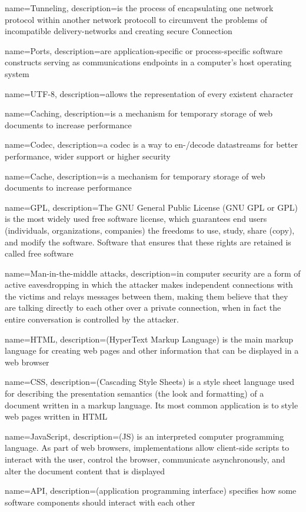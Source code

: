 {
  name=Tunneling,
  description={is the process of encapsulating one network protocol within another network protocoll to circumvent the problems of incompatible delivery-networks and creating secure Connection}
}

{
  name=Ports,
  description={are application-specific or process-specific software constructs serving as communications endpoints in a computer's host operating system}
}

{
  name=UTF-8,
  description={allows the representation of every existent character}
}

{
  name=Caching,
  description={is a mechanism for temporary storage of web documents to increase performance}
}

{
  name=Codec,
  description={a codec is a way to en-/decode datastreams for better performance, wider support or higher security}
}

{
  name=Cache,
  description={is a mechanism for temporary storage of web documents to increase performance}
}

{
  name=GPL,
  description={The GNU General Public License (GNU GPL or GPL) is the most widely used free software license, which guarantees end users (individuals, organizations, companies) the freedoms to use, study, share (copy), and modify the software. Software that ensures that these rights are retained is called free software}
}

{
  name=Man-in-the-middle attacks,
  description={in computer security are a form of active eavesdropping in which the attacker makes independent connections with the victims and relays messages between them, making them believe that they are talking directly to each other over a private connection, when in fact the entire conversation is controlled by the attacker.}
}

{
  name=HTML,
  description={(HyperText Markup Language) is the main markup language for creating web pages and other information that can be displayed in a web browser}
}

{
  name=CSS,
  description={(Cascading Style Sheets) is a style sheet language used for describing the presentation semantics (the look and formatting) of a document written in a markup language. Its most common application is to style web pages written in HTML}
}

{
  name=JavaScript,
  description={(JS) is an interpreted computer programming language. As part of web browsers, implementations allow client-side scripts to interact with the user, control the browser, communicate asynchronously, and alter the document content that is displayed}
}

{
  name=API,
  description={(application programming interface) specifies how some software components should interact with each other}
}
